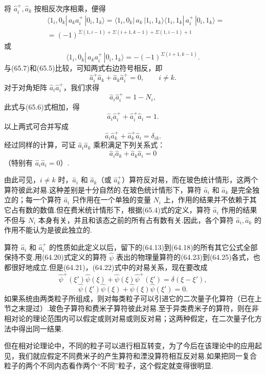 将 $\hat{a}_i^{+},\hat{a}_k$ 按相反次序相乘，便得
\begin{equation*}
\begin{aligned}
  &\langle 1_i,0_k|\,a_ka_i^{+}\,|0_i,1_k\rangle
  =\langle 1_i,0_k|\,a_k\,|1_i,1_k\rangle\langle 1_i,1_k|\,a_i^{+}\,|0_i,1_k\rangle=\\
  &=(-1)^{\Sigma(1,i-1)+\Sigma(i+1,k-1)+\Sigma(1,i-1)+1}
\end{aligned}
\end{equation*}
或
\begin{equation}
  \langle 1_i,0_k|\,a_ka_i^{+}\,|0_i,1_k\rangle=-(-1)^{\Sigma(i+1,k-1)}.
\end{equation}
与(65.7)和(65.5)比较，可知两式右边符号相反，即
\begin{equation*}
  \hat{a}_i^{+}\hat{a}_k+\hat{a}_k\hat{a}_i^{+}=0,\qquad i\neq k.
\end{equation*}
对于对角矩阵 $\hat{a}_i\hat{a}_i^{+}$，我们求得
\begin{equation}
  \hat{a}_i\hat{a}_i^{+}=1-N_i,
\end{equation}
此式与(65.6)式相加，得
\begin{equation*}
  \hat{a}_i\hat{a}_i^{+}+\hat{a}_i^{+}\hat{a}_i=1.
\end{equation*}
以上两式可合并写成
\begin{equation}
  \hat{a}_i\hat{a}_k^{+}+\hat{a}_k^{+}\hat{a}_i=\delta_{ik}.
\end{equation}
经过同样的计算，可证 $\hat{a}_i\hat{a}_k$ 乘积满足下列关系式：
\begin{equation}
  \hat{a}_i\hat{a}_k+\hat{a}_k\hat{a}_i=0
\end{equation}
（特别有 $\hat{a}_i\hat{a}_i=0$）.

由此可见，$i\neq k$ 时，$\hat{a}_i$ 和 $\hat{a}_k$（或 $\hat{a}_k^{+}$）算符反对易，而在玻色统计情形，这两个算符彼此对易.这种差别是十分自然的.在玻色统计情形下，算符 $\hat{a}_i$ 和 $\hat{a}_k$ 是完全独立的；每一个算符 $\hat{a}_i$ 只作用在一个单独的变量 $N_i$ 上，作用的结果并不依赖于其它占有数的数值.但在费米统计情形下，根据(65.4)式的定义，算符 $\hat{a}_i$ 作用的结果不但与 $N_i$ 本身有关，并且和该态之前的所有占有数有关.因此，各个算符 $\hat{a}_i,\hat{a}_k$ 的作用不能认为是彼此独立的.

算符 $\hat{a}_i$ 和 $\hat{a}_i^{+}$ 的性质如此定义以后，留下的(64.13)到(64.18)的所有其它公式全部保持不变.用(64.20)式定义的算符 $\hat{\psi}$ 表出的物理量算符的(64.23)到(64.25)各式，也都很好地成立.但是(64.21)，(64.22)式中的对易关系，现在要改成
\begin{equation}
  \hat{\psi}^{+}(\xi')\hat{\psi}(\xi)+\hat{\psi}(\xi)\hat{\psi}^{+}(\xi')=\delta(\xi-\xi'),
\end{equation}
\begin{equation}
  \hat{\psi}(\xi')\hat{\psi}(\xi)+\hat{\psi}(\xi)\hat{\psi}(\xi')=0.
\end{equation}
如果系统由两类粒子所组成，则对每类粒子可以引进它的二次量子化算符（已在上节之末提过）.玻色子算符和费米子算符彼此对易.至于异类费米子的算符，则在非相对论的理论范围内可以假定或则对易或则反对易；这两种假定，在二次量子化方法中得出同一结果.

但在相对论理论中，不同的粒子可以进行相互转变，为了今后在该理论中的应用起见，我们就应假定不同费米子的产生算符和湮没算符相互反对易.如果把同一复合粒子的两个不同内态看作两个“不同”粒子，这个假定就变得很明显.
